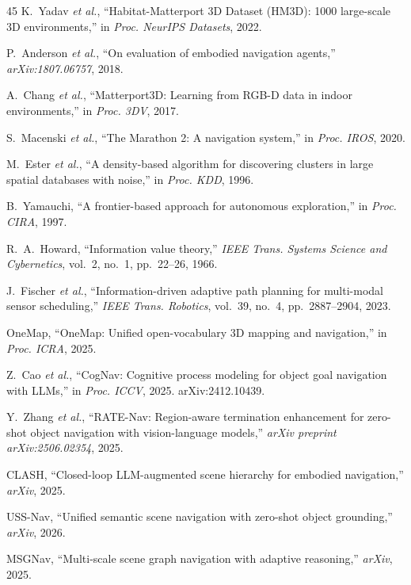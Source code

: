 \documentclass[conference]{IEEEtran}
\begin{document}
\begin{thebibliography}{45}
K.~Yadav \emph{et al.},
``Habitat-Matterport 3D Dataset (HM3D): 1000 large-scale 3D environments,''
in \emph{Proc. NeurIPS Datasets}, 2022.

P.~Anderson \emph{et al.},
``On evaluation of embodied navigation agents,''
\emph{arXiv:1807.06757}, 2018.

A.~Chang \emph{et al.},
``Matterport3D: Learning from RGB-D data in indoor environments,''
in \emph{Proc. 3DV}, 2017.

S.~Macenski \emph{et al.},
``The Marathon 2: A navigation system,''
in \emph{Proc. IROS}, 2020.

M.~Ester \emph{et al.},
``A density-based algorithm for discovering clusters in large spatial databases with noise,''
in \emph{Proc. KDD}, 1996.

B.~Yamauchi,
``A frontier-based approach for autonomous exploration,''
in \emph{Proc. CIRA}, 1997.

R.~A.~Howard,
``Information value theory,''
\emph{IEEE Trans. Systems Science and Cybernetics}, vol.~2, no.~1, pp.~22--26, 1966.

J.~Fischer \emph{et al.},
``Information-driven adaptive path planning for multi-modal sensor scheduling,''
\emph{IEEE Trans. Robotics}, vol.~39, no.~4, pp.~2887--2904, 2023.

OneMap,
``OneMap: Unified open-vocabulary 3D mapping and navigation,''
in \emph{Proc. ICRA}, 2025.

Z.~Cao \emph{et al.},
``CogNav: Cognitive process modeling for object goal navigation with LLMs,''
in \emph{Proc. ICCV}, 2025.
arXiv:2412.10439.

Y.~Zhang \emph{et al.},
``RATE-Nav: Region-aware termination enhancement for zero-shot object navigation
with vision-language models,''
\emph{arXiv preprint arXiv:2506.02354}, 2025.

CLASH,
``Closed-loop LLM-augmented scene hierarchy for embodied navigation,''
\emph{arXiv}, 2025.

USS-Nav,
``Unified semantic scene navigation with zero-shot object grounding,''
\emph{arXiv}, 2026.

MSGNav,
``Multi-scale scene graph navigation with adaptive reasoning,''
\emph{arXiv}, 2025.


\end{thebibliography}
\end{document}

